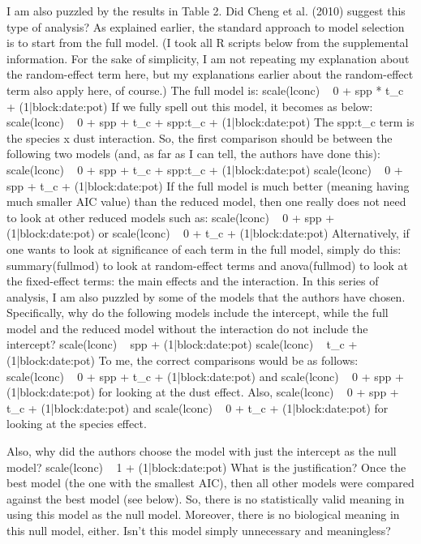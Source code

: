 \documentclass[parskip=half]{scrartcl}
\begin{document}
I am also puzzled by the results in Table 2.
Did Cheng et al. (2010) suggest this type of analysis?
As explained earlier, the standard approach to model selection is to start from the full model.
(I took all R scripts below from the supplemental information.  For the sake of simplicity, I am not repeating my explanation about the random-effect term here, but my explanations earlier about the random-effect term also apply here, of course.)
The full model is:
scale(lconc) ~ 0 + spp * t\_c + (1|block:date:pot)
If we fully spell out this model, it becomes as below:
scale(lconc) ~ 0 + spp + t\_c + spp:t\_c + (1|block:date:pot)
The spp:t\_c term is the species x dust interaction.
So, the first comparison should be between the following two models (and, as far as I can tell, the authors have done this):
scale(lconc) ~ 0 + spp + t\_c + spp:t\_c + (1|block:date:pot)
scale(lconc) ~ 0 + spp + t\_c + (1|block:date:pot)
If the full model is much better (meaning having much smaller AIC value) than the reduced model, then one really does not need to look at other reduced models such as:
scale(lconc) ~ 0 + spp + (1|block:date:pot) or
scale(lconc) ~ 0 + t\_c + (1|block:date:pot)
Alternatively, if one wants to look at significance of each term in the full model, simply do this:
summary(fullmod) to look at random-effect terms and
anova(fullmod) to look at the fixed-effect terms: the main effects and the interaction.
In this series of analysis, I am also puzzled by some of the models that the authors have chosen.
Specifically, why do the following models include the intercept, while the full model and the reduced model without the interaction do not include the intercept?
scale(lconc) ~ spp + (1|block:date:pot)
scale(lconc) ~ t\_c + (1|block:date:pot)
To me, the correct comparisons would be as follows:
scale(lconc) ~ 0 + spp + t\_c + (1|block:date:pot) and
scale(lconc) ~ 0 + spp + (1|block:date:pot) for looking at the dust effect.
Also,
scale(lconc) ~ 0 + spp + t\_c + (1|block:date:pot) and
scale(lconc) ~ 0 +  t\_c + (1|block:date:pot) for looking at the species effect.

Also, why did the authors choose the model with just the intercept as the null model?
scale(lconc) ~ 1 + (1|block:date:pot)
What is the justification?
Once the best model (the one with the smallest AIC), then all other models were compared against the best model (see below).
So, there is no statistically valid meaning in using this model as the null model.
Moreover, there is no biological meaning in this null model, either.
Isn't this model simply unnecessary and meaningless?
\end{document}
